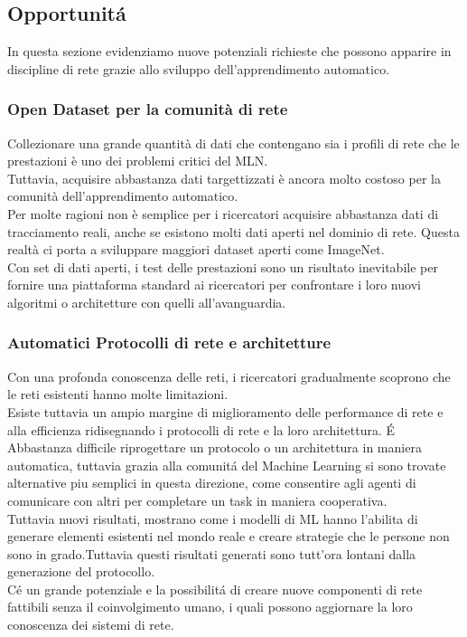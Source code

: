 \documentclass[../tesi.tex]{subfiles}
\begin{document}
\subsection{Opportunitá}
In questa sezione evidenziamo nuove potenziali richieste che possono apparire in discipline di rete grazie allo sviluppo dell’apprendimento automatico.

\subsubsection{Open Dataset per la comunità di rete}

Collezionare una grande quantità di dati che contengano sia i profili di rete che le prestazioni è uno dei problemi critici del MLN.\\
Tuttavia, acquisire abbastanza dati targettizzati è ancora molto costoso per la comunità dell’apprendimento automatico.\\
Per molte ragioni non è semplice per i ricercatori acquisire abbastanza dati di tracciamento reali, anche se esistono molti dati aperti nel dominio di rete.
Questa realtà ci porta a sviluppare maggiori dataset aperti come ImageNet.\\
Con set di dati aperti, i test delle prestazioni sono un risultato inevitabile per fornire una piattaforma standard ai ricercatori per confrontare i loro nuovi algoritmi o architetture con quelli all’avanguardia.

\subsubsection{Automatici Protocolli di rete e architetture}

Con una profonda conoscenza delle reti, i ricercatori gradualmente scoprono che le reti esistenti hanno molte limitazioni.\\
Esiste tuttavia un ampio margine di miglioramento delle performance di rete e alla efficienza ridisegnando i protocolli di rete e la loro architettura. É Abbastanza difficile riprogettare un protocolo o un architettura in maniera automatica, tuttavia grazia alla comunitá del Machine Learning si sono trovate alternative piu semplici in questa direzione, come consentire agli agenti di comunicare con altri per completare un task in maniera cooperativa.\\
Tuttavia nuovi risultati, mostrano come i modelli di ML hanno l’abilita di generare elementi esistenti nel mondo reale e creare strategie che le persone non sono in grado.Tuttavia questi risultati generati sono tutt’ora lontani dalla generazione del protocollo.\\
Cé un grande potenziale e la possibilitá di creare nuove componenti di rete fattibili senza il coinvolgimento umano, i quali possono aggiornare la loro conoscenza dei sistemi di rete.
\end{document}
